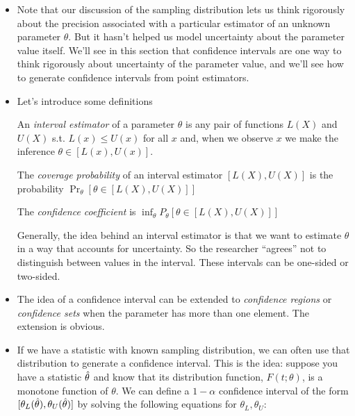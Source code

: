\begin{itemize}  

\item Note that our discussion of the sampling distribution lets us
  think rigorously about the precision associated with a particular
  estimator of an unknown parameter $\theta$.  But it hasn't helped us
  model uncertainty about the parameter value itself.  We'll see in
  this section that confidence intervals are one way to think
  rigorously about uncertainty of the parameter value, and we'll see
  how to generate confidence intervals from point estimators.

\item Let's introduce some definitions
  \begin{defn}
    An \emph{interval estimator} of a parameter $\theta$ is any pair of
    functions $L(X)$ and $U(X)$ s.t. $L(x) \leq U(x)$ for all $x$ and,
    when we observe $x$ we make the inference $\theta \in [L(x), U(x)]$.
  \end{defn}

  \begin{defn}
    The \emph{coverage probability} of an interval estimator
    $[L(X), U(X)]$ is the probability $\Pr_\theta[\theta \in [L(X), U(X)]]$
  \end{defn}

  \begin{defn}
    The \emph{confidence coefficient} is $\inf_\theta P_\theta[\theta \in [L(X), U(X)]]$
  \end{defn}

  Generally, the idea behind an interval estimator is that we want to
  estimate $\theta$ in a way that accounts for uncertainty.  So the
  researcher ``agrees'' not to distinguish between values in the
  interval.  These intervals can be one-sided or two-sided.

\item The idea of a confidence interval can be extended to
  \emph{confidence regions} or \emph{confidence sets} when the
  parameter has more than one element.  The extension is obvious.

\item If we have a statistic with known sampling distribution, we can
  often use that distribution to generate a confidence interval.  This
  is the idea: suppose you have a statistic $\hat{\theta}$ and know that its
  distribution function, $F(t; \theta)$, is a monotone function of $\theta$.  We
  can define a $1-\alpha$ confidence interval of the form $[\theta_L(\hat{\theta}),
  \theta_U(\hat{\theta})]$ by solving the following equations for $\theta_L, \theta_U$:


\end{itemize}
